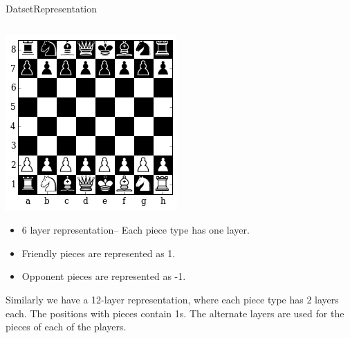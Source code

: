 \documentclass[9pt, unknownkeysallowed]{beamer}
\begin{document}
\begin{frame}{Datset}{Representation}
 \begin{columns}
  \begin{column}{3.7cm}
  \includegraphics[width=\textwidth]{../img/best_moves/output_17_0.png}
  \begin{itemize}
  \tiny 
  \item 6 layer representation-- Each piece type has one layer.
  \item Friendly pieces are represented as 1. 
  \item Opponent pieces are represented as -1.
  \end{itemize}
  \tiny{
  Similarly we have a 12-layer representation, where each piece type has 2 
layers each. The positions with pieces contain 1s. The alternate layers are 
used for the pieces of each of the players.}


\end{column}
\end{columns}
\end{frame}
\end{document}
